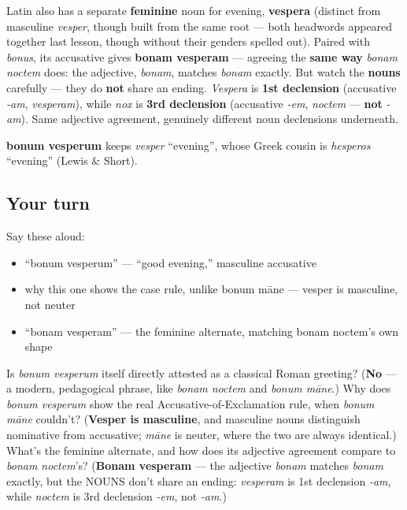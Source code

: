 \begin{grammarlens}[title={Grammar Lens: A feminine alternate: bonam vesperam}]
Latin also has a separate \textbf{feminine} noun for evening, \textbf{vespera} (distinct from masculine \emph{vesper}, though built from the same root — both headwords appeared together last lesson, though without their genders spelled out). Paired with \emph{bonus}, its accusative gives \textbf{bonam vesperam} — agreeing the \textbf{same way} \emph{bonam noctem} does: the adjective, \emph{bonam}, matches \emph{bonam} exactly. But watch the \textbf{nouns} carefully — they do \textbf{not} share an ending. \emph{Vespera} is \textbf{1st declension} (accusative \emph{-am}, \emph{vesperam}), while \emph{nox} is \textbf{3rd declension} (accusative \emph{-em}, \emph{noctem} — \textbf{not} \emph{-am}). Same adjective agreement, genuinely different noun declensions underneath.
\end{grammarlens}

\begin{cousinweb}
\textbf{bonum vesperum} keeps \emph{vesper} \textquotedblleft{}evening\textquotedblright{}, whose Greek cousin is \emph{hesperos} \textquotedblleft{}evening\textquotedblright{} (Lewis \& Short).
\end{cousinweb}

\subsection*{Your turn}
Say these aloud:

\begin{itemize}
\raggedright
  \item \textquotedblleft{}bonum vesperum\textquotedblright{} — \textquotedblleft{}good evening,\textquotedblright{} masculine accusative
  \item why this one shows the case rule, unlike bonum māne — vesper is masculine, not neuter
  \item \textquotedblleft{}bonam vesperam\textquotedblright{} — the feminine alternate, matching bonam noctem's own shape
\end{itemize}

\begin{tcolorbox}[breakable,colback=teal!4,colframe=teal!35!black,title={Before you move on}]
Is \emph{bonum vesperum} itself directly attested as a classical Roman greeting? (\textbf{No} — a modern, pedagogical phrase, like \emph{bonam noctem} and \emph{bonum māne}.) Why does \emph{bonum vesperum} show the real Accusative-of-Exclamation rule, when \emph{bonum māne} couldn't? (\textbf{Vesper is masculine}, and masculine nouns distinguish nominative from accusative; \emph{māne} is neuter, where the two are always identical.) What's the feminine alternate, and how does its adjective agreement compare to \emph{bonam noctem}'s? (\textbf{Bonam vesperam} — the adjective \emph{bonam} matches \emph{bonam} exactly, but the NOUNS don't share an ending: \emph{vesperam} is 1st declension \emph{-am}, while \emph{noctem} is 3rd declension \emph{-em}, not \emph{-am}.)
\end{tcolorbox}
